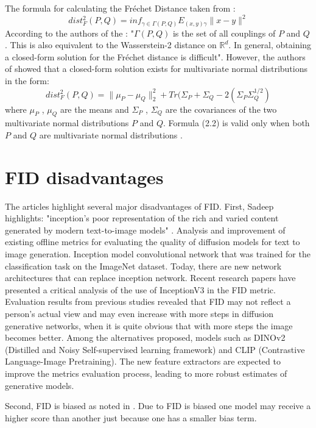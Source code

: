 The formula for calculating the Fréchet Distance taken from \cite{FD}:
\begin{equation}
dist^2_F(P,Q)=inf_{\gamma\in \Gamma(P,Q)}E_{(x,y)\gamma}\|x-y\|^2
\end{equation}
According to the authors of the \cite{KD_CLIP}: "$\Gamma(P, Q)$ is the set of all couplings of $P$ and $Q$. This is also equivalent to the Wasserstein-2 distance on $\mathbb{R}^d$. In general, obtaining a closed-form solution for the Fréchet distance is difficult". However, the authors of \cite{FD} showed that a closed-form solution exists for multivariate normal distributions in the form:
\begin{equation}
dist^2_F(P,Q)=\|\mu_P-\mu_Q\|_2^2+Tr(\Sigma_P+\Sigma_Q-2(\Sigma_P\Sigma_Q^{1/2})
\end{equation}
where $\mu_P$ , $\mu_Q$ are the means and $\Sigma_P$ , $\Sigma_Q$ are the covariances of the two multivariate normal distributions $P$ and $Q$. Formula (2.2) is valid only when both $P$ and $Q$ are multivariate normal distributions \cite{FD}.
\section{FID disadvantages}
The articles highlight several major disadvantages of FID. First, Sadeep highlights: "inception’s poor representation of the rich and varied content generated by modern text-to-image models" \cite[p.1]{KD_CLIP}. Analysis and improvement of existing offline metrics for evaluating the quality of diffusion models for text to image generation. Inception model \cite{InceptionV3} convolutional network that was trained for the classification task on the ImageNet dataset. Today, there are new network architectures that can replace inception network. Recent research papers  \cite{KD_CLIP}\cite{FD_DINOv2}\cite{FID_Med} have presented a critical analysis of the use of InceptionV3 in the FID metric. Evaluation results from previous studies \cite{KD_CLIP} revealed that FID may not reflect a person's actual view and may even increase with more steps in diffusion generative networks, when it is quite obvious that with more steps the image becomes better. Among the alternatives proposed, models such as DINOv2 \cite{DINOv2}(Distilled and Noisy Self-supervised learning framework) and CLIP \cite{CLIP}(Contrastive Language-Image Pretraining). The new feature extractors are expected to improve the metrics evaluation process, leading to more robust estimates of generative models.

Second, FID is biased as noted in \cite{unbiasedFID}. Due to FID is biased one model may receive a higher score than another just because one has a smaller bias term.

